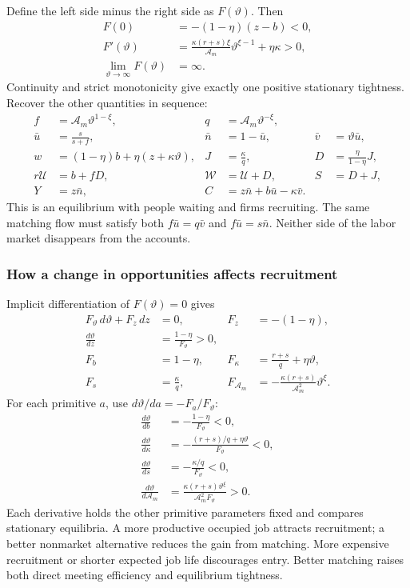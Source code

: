 Define the left side minus the right side as $F(\vartheta)$. Then
\begin{align}
 F(0)&=-(1-\eta)(z-b)<0,\\
 F'(\vartheta)
   &=\frac{\kappa(r+s)\xi}{\mathcal A_m}\vartheta^{\xi-1}
        +\eta\kappa>0,\\
 \lim_{\vartheta\to\infty}F(\vartheta)&=\infty.
\end{align}
Continuity and strict monotonicity give exactly one positive stationary
tightness. Recover the other quantities in sequence:
\begin{align}
 f&=\mathcal A_m\vartheta^{1-\xi}, &q&=\mathcal A_m\vartheta^{-\xi},\\
 \bar u&=\frac{s}{s+f}, &\bar n&=1-\bar u, &\bar v&=\vartheta\bar u,\\
 w&=(1-\eta)b+\eta(z+\kappa\vartheta),
 &J&=\frac\kappa q, &D&=\frac\eta{1-\eta}J,\\
 r\mathcal U&=b+fD,
 &\mathcal W&=\mathcal U+D, &S&=D+J,\\
 Y&=z\bar n,
 &C&=z\bar n+b\bar u-\kappa\bar v.
\end{align}
This is an equilibrium with people waiting and firms recruiting. The same
matching flow must satisfy both $f\bar u=q\bar v$ and
$f\bar u=s\bar n$. Neither side of the labor market disappears from the
accounts.

\subsubsection{How a change in opportunities affects recruitment}

Implicit differentiation of $F(\vartheta)=0$ gives
\begin{align}
 F_\vartheta\,d\vartheta+F_z\,dz&=0,
 &F_z&=-(1-\eta),\\
 \frac{d\vartheta}{dz}&=\frac{1-\eta}{F_\vartheta}>0,\\
 F_b&=1-\eta,
 &F_\kappa&=\frac{r+s}{q}+\eta\vartheta,\\
 F_s&=\frac\kappa q,
 &F_{\mathcal A_m}&=-\frac{\kappa(r+s)}{\mathcal A_m^2}\vartheta^\xi.
\end{align}
For each primitive $a$, use $d\vartheta/da=-F_a/F_\vartheta$:
\begin{align}
 \frac{d\vartheta}{db}&=-\frac{1-\eta}{F_\vartheta}<0,\\
 \frac{d\vartheta}{d\kappa}
 &=-\frac{(r+s)/q+\eta\vartheta}{F_\vartheta}<0,\\
 \frac{d\vartheta}{ds}&=-\frac{\kappa/q}{F_\vartheta}<0,\\
 \frac{d\vartheta}{d\mathcal A_m}
 &=\frac{\kappa(r+s)\vartheta^\xi}
        {\mathcal A_m^2 F_\vartheta}>0.
\end{align}
Each derivative holds the other primitive parameters fixed and compares
stationary equilibria. A more productive occupied job attracts recruitment;
a better nonmarket alternative reduces the gain from matching. More expensive
recruitment or shorter expected job life discourages entry. Better matching
raises both direct meeting efficiency and equilibrium tightness.

